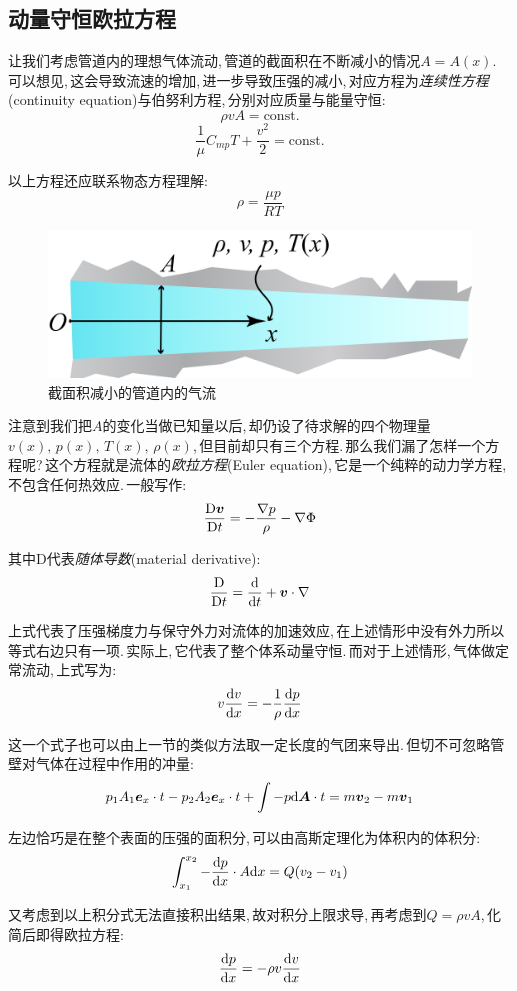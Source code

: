 \subsection{动量守恒\ca 欧拉方程}
让我们考虑管道内的理想气体流动,\,管道的截面积在不断减小的情况$A=A(x)$.\,可以想见,\,这会导致流速的增加,\,进一步导致压强的减小,\,对应方程为\emph{连续性方程}(continuity equation)与伯努利方程,\,分别对应质量与能量守恒:
\[\rho vA=\mathrm{const.}\]
\[\frac{1}{\mu}C_{mp}T+\frac{v^2}{2}=\mathrm{const.}\]

以上方程还应联系物态方程理解:
\[\rho=\frac{\mu p}{RT}\]

\begin{figure}[H]
\centering
\includegraphics[width=12cm]{image/5-1-12.png}
\caption{截面积减小的管道内的气流}
\end{figure}



注意到我们把$A$的变化当做已知量以后,\,却仍设了待求解的四个物理量$v(x),\,p(x),\,T(x),\,\rho(x)$,\,但目前却只有三个方程.\,那么我们漏了怎样一个方程呢?\,这个方程就是流体的\emph{欧拉方程}(Euler equation),\,它是一个纯粹的动力学方程,\,不包含任何热效应.\,一般写作:
\[\frac{\mathrm{D} \boldsymbol{v}}{\mathrm{D} t}=-\frac{\nabla p}{\rho}-\nabla \Phi\]

其中$\mathrm{D}$代表\emph{随体导数}(material derivative):
\[\frac{\mathrm{D}}{\mathrm{D} t}=\frac{\textrm{d}}{\textrm{d} t}+\boldsymbol{v}\cdot \nabla\]

上式代表了压强梯度力与保守外力对流体的加速效应,\,在上述情形中没有外力所以等式右边只有一项.\,实际上,\,它代表了整个体系动量守恒.\,而对于上述情形,\,气体做定常流动,\,上式写为:
\[v\frac{\textrm{d} v}{\textrm{d} x}=-\frac{1}{\rho}\frac{\textrm{d} p}{\textrm{d} x}\]

这一个式子也可以由上一节的类似方法\ca 取一定长度的气团来导出.\,但切不可忽略管壁对气体在过程中作用的冲量:
\[p_1A_1\boldsymbol{e}_x \cdot t-p_2A_2\boldsymbol{e}_x \cdot t+\int -p\textrm{d} \boldsymbol{A} \cdot t=m\boldsymbol{v}_2-m\boldsymbol{v}_1\]

左边恰巧是在整个表面的压强的面积分,\,可以由高斯定理化为体积内的体积分:
\[\int_{x_1}^{x_2}-\frac{\textrm{d} p}{\textrm{d} x}\cdot A\textrm{d} x=Q(v_2-v_1)\]

又考虑到以上积分式无法直接积出结果,\,故对积分上限求导,\,再考虑到$Q=\rho vA$,\,化简后即得欧拉方程:
\[\frac{\textrm{d} p}{\textrm{d} x}=-\rho v\frac{\textrm{d} v}{\textrm{d} x}\]

